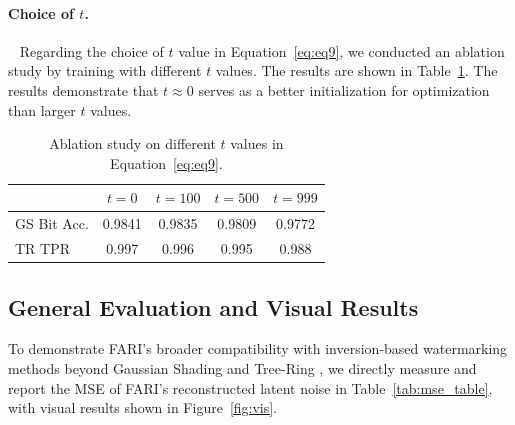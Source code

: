\documentclass{article}
\begin{document}
\paragraph{Choice of $t$.}~ Regarding the choice of $t$ value in Equation~\ref{eq:eq9}, we conducted an ablation study by training with different $t$ values. The results are shown in Table~\ref{tab:ablation_t}. The results demonstrate that $t\approx0$ serves as a better initialization for optimization than larger $t$ values.

\begin{table}[ht]
\centering
\caption{Ablation study on different $t$ values in Equation~\ref{eq:eq9}.}
\label{tab:ablation_t}
\begin{tabular}{lcccc}
\toprule
& $t=0$ & $t=100$ & $t=500$ & $t=999$ \\
\midrule
GS Bit Acc. & 0.9841 & 0.9835 & 0.9809 & 0.9772 \\
TR TPR & 0.997 & 0.996 & 0.995 & 0.988 \\
\bottomrule
\end{tabular}
\end{table}

\subsection{General Evaluation and Visual Results}

To demonstrate FARI's broader compatibility with inversion-based watermarking methods beyond Gaussian Shading \citep{gs_2024} and Tree-Ring \citep{treering_2023}, we directly measure and report the MSE of FARI's reconstructed latent noise in Table~\ref{tab:mse_table}, with visual results shown in Figure~\ref{fig:vis}.
\end{document}

